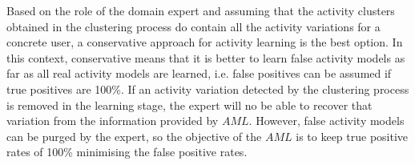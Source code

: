 Based on the role of the domain expert and assuming that the activity clusters obtained in the clustering process do contain all the activity variations for a concrete user, a conservative approach for activity learning is the best option. In this context, conservative means that it is better to learn false activity models as far as all real activity models are learned, i.e. false positives can be assumed if true positives are 100\%. If an activity variation detected by the clustering process is removed in the learning stage, the expert will no be able to recover that variation from the information provided by $AML$. However, false activity models can be purged by the expert, so the objective of the $AML$ is to keep true positive rates of 100\% minimising the false positive rates. 

